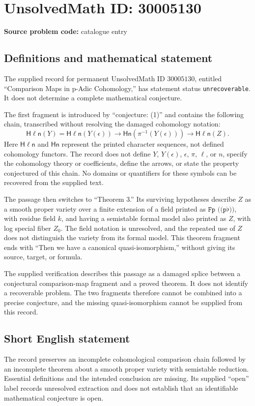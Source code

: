 \documentclass[11pt]{article}
\begin{document}
\section*{UnsolvedMath ID: 30005130}
\textbf{Source problem code:} catalogue entry
\subsection{Definitions and mathematical statement}
The supplied record for permanent UnsolvedMath ID \(30005130\), entitled ``Comparison Maps in p-Adic Cohomology,'' has statement status \texttt{unrecoverable}. It does not determine a complete mathematical conjecture.

The first fragment is introduced by ``conjecture: (1)'' and contains the following chain, transcribed without resolving the damaged cohomology notation:
\[
\mathsf{H\ell n}(Y)=\mathsf{H\ell n}(Y(\epsilon))
\longrightarrow \mathsf{H n}(\pi^{-1}(Y(\epsilon)))
\longrightarrow \mathsf{H\ell n}(Z).
\]
Here \(\mathsf{H\ell n}\) and \(\mathsf{H n}\) represent the printed character sequences, not defined cohomology functors. The record does not define \(Y\), \(Y(\epsilon)\), \(\epsilon\), \(\pi\), \(\ell\), or \(n\), specify the cohomology theory or coefficients, define the arrows, or state the property conjectured of this chain. No domains or quantifiers for these symbols can be recovered from the supplied text.

The passage then switches to ``Theorem 3.'' Its surviving hypotheses describe \(Z\) as a smooth proper variety over a finite extension of a field printed as \(\texttt{Fp ((p}\flat\texttt{))}\), with residue field \(k\), and having a semistable formal model also printed as \(Z\), with log special fiber \(Z_0\). The field notation is unresolved, and the repeated use of \(Z\) does not distinguish the variety from its formal model. This theorem fragment ends with ``Then we have a canonical quasi-isomorphism,'' without giving its source, target, or formula.

The supplied verification describes this passage as a damaged splice between a conjectural comparison-map fragment and a proved theorem. It does not identify a recoverable problem. The two fragments therefore cannot be combined into a precise conjecture, and the missing quasi-isomorphism cannot be supplied from this record.
\subsection{Short English statement}
The record preserves an incomplete cohomological comparison chain followed by an incomplete theorem about a smooth proper variety with semistable reduction. Essential definitions and the intended conclusion are missing. Its supplied ``open'' label records unresolved extraction and does not establish that an identifiable mathematical conjecture is open.
\end{document}
